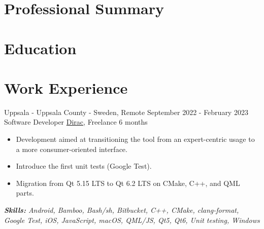 \documentclass[11pt,a4paper,roman]{moderncv}
\begin{document}
\makecvtitle
\vspace{-2.5\baselineskip}

\section{Professional Summary}

\section{Education}

\section{Work Experience}


\cventry
{Uppsala - Uppsala County - Sweden, Remote}
{September 2022 - February 2023}
{Software Developer}
{\href{https://www.dirac.com}{Dirac}, Freelance}
{6 months}
{}
{
\begin{itemize}
	\item Development aimed at transitioning the tool from an expert-centric usage to a more consumer-oriented interface.
	\item Introduce the first unit tests (Google Test).
	\item Migration from Qt 5.15 LTS to Qt 6.2 LTS on CMake, C++, and QML parts.
\end{itemize}

{\textcolor{color2}{\textit{\textbf{Skills:}
	Android,
	Bamboo,
	Bash/sh,
	Bitbucket,
	C++,
	CMake,
	clang-format,
	Google Test,
	iOS,
	JavaScript,
	macOS,
	QML/JS,
   Qt5,
	Qt6,
	Unit testing,
	Windows
	\newline
}}}}
\end{document}
